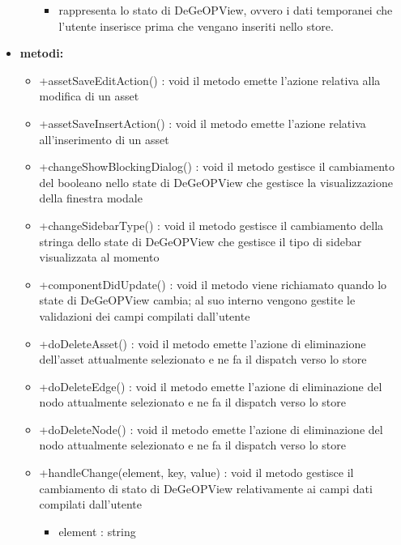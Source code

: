 \begin{itemize}
\begin{itemize}
\begin{itemize}
			\item rappresenta lo stato di DeGeOPView, ovvero i dati temporanei che l'utente inserisce prima che vengano inseriti nello store.\end{itemize}
	\end{itemize}
	\item \textbf{metodi:}
	\begin{itemize}
		\item +assetSaveEditAction() : void\newline
		il metodo emette l'azione relativa alla modifica di un asset
		\item +assetSaveInsertAction() : void\newline
		il metodo emette l'azione relativa all'inserimento di un asset
		\item +changeShowBlockingDialog() : void\newline
		il metodo gestisce il cambiamento del booleano nello state di DeGeOPView che gestisce la visualizzazione della finestra modale
		\item +changeSidebarType() : void\newline
		il metodo gestisce il cambiamento della stringa dello state di DeGeOPView che gestisce il tipo di sidebar visualizzata al momento
		\item +componentDidUpdate() : void\newline
		il metodo viene richiamato quando lo state di DeGeOPView cambia; al suo interno vengono gestite le validazioni dei campi compilati dall'utente
		\item +doDeleteAsset() : void\newline
		il metodo emette l'azione di eliminazione dell'asset attualmente selezionato e ne fa il dispatch verso lo store
		\item +doDeleteEdge() : void\newline
		il metodo emette l'azione di eliminazione del nodo attualmente selezionato e ne fa il dispatch verso lo store
		\item +doDeleteNode() : void\newline
		il metodo emette l'azione di eliminazione del nodo attualmente selezionato e ne fa il dispatch verso lo store
		\item +handleChange(element, key, value) : void\newline
		il metodo gestisce il cambiamento di stato di DeGeOPView relativamente ai campi dati compilati dall'utente
		\begin{itemize}
			\item element : string\\

\end{itemize}
\end{itemize}
\end{itemize}
